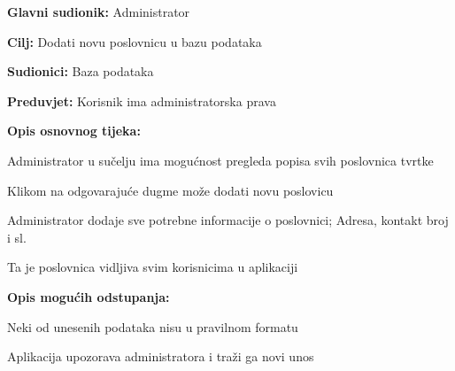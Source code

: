 					\noindent {}
					\begin{packed_item}
	
						\item \textbf{Glavni sudionik: }Administrator
						\item  \textbf{Cilj: }Dodati novu poslovnicu u bazu podataka
						\item  \textbf{Sudionici: }Baza podataka
						\item  \textbf{Preduvjet: }Korisnik ima administratorska prava
						\item  \textbf{Opis osnovnog tijeka:}
						
						\item[] \begin{packed_enum}
							\item Administrator u sučelju ima mogućnost pregleda popisa svih poslovnica tvrtke
							\item Klikom na odgovarajuće dugme može dodati novu poslovicu
							\item Administrator dodaje sve potrebne informacije o poslovnici; Adresa, kontakt broj i sl.
							\item Ta je poslovnica vidljiva svim korisnicima u aplikaciji
						\end{packed_enum}
						
						\item  \textbf{Opis mogućih odstupanja: }
						
						\item[] \begin{packed_item}
	
							\item[3.a] Neki od unesenih podataka nisu u pravilnom formatu
							\item[] \begin{packed_enum}
								\item Aplikacija upozorava administratora i traži ga novi unos
							\end{packed_enum}
						\end{packed_item}
						
					\end{packed_item}
					
